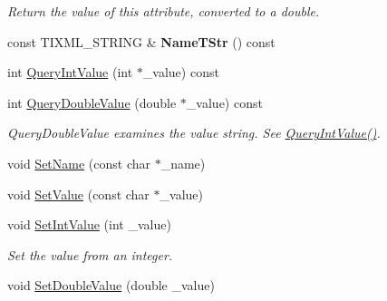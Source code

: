 \begin{DoxyCompactItemize}
\begin{DoxyCompactList}\small\item\em \-Return the value of this attribute, converted to a double. \end{DoxyCompactList}\item 
\hypertarget{class_ti_xml_attribute_a64cee17bceb8232eb0736d26dd082d79}{
const \-T\-I\-X\-M\-L\-\_\-\-S\-T\-R\-I\-N\-G \& {\bfseries \-Name\-T\-Str} () const }
\label{class_ti_xml_attribute_a64cee17bceb8232eb0736d26dd082d79}

\item 
int \hyperlink{class_ti_xml_attribute_ad6c93088ee21af41a107931223339344}{\-Query\-Int\-Value} (int $\ast$\-\_\-value) const 
\item 
\hypertarget{class_ti_xml_attribute_ac87b2a8489906a5d7aa2875f20be3513}{
int \hyperlink{class_ti_xml_attribute_ac87b2a8489906a5d7aa2875f20be3513}{\-Query\-Double\-Value} (double $\ast$\-\_\-value) const }
\label{class_ti_xml_attribute_ac87b2a8489906a5d7aa2875f20be3513}

\begin{DoxyCompactList}\small\item\em \-Query\-Double\-Value examines the value string. \-See \hyperlink{class_ti_xml_attribute_ad6c93088ee21af41a107931223339344}{\-Query\-Int\-Value()}. \end{DoxyCompactList}\item 
void \hyperlink{class_ti_xml_attribute_ab7fa3d21ff8d7c5764cf9af15b667a99}{\-Set\-Name} (const char $\ast$\-\_\-name)
\item 
void \hyperlink{class_ti_xml_attribute_a2dae44178f668b3cb48101be4f2236a0}{\-Set\-Value} (const char $\ast$\-\_\-value)
\item 
\hypertarget{class_ti_xml_attribute_a7e065df640116a62ea4f4b7da5449cc8}{
void \hyperlink{class_ti_xml_attribute_a7e065df640116a62ea4f4b7da5449cc8}{\-Set\-Int\-Value} (int \-\_\-value)}
\label{class_ti_xml_attribute_a7e065df640116a62ea4f4b7da5449cc8}

\begin{DoxyCompactList}\small\item\em \-Set the value from an integer. \end{DoxyCompactList}\item 
\hypertarget{class_ti_xml_attribute_a0316da31373496c4368ad549bf711394}{
void \hyperlink{class_ti_xml_attribute_a0316da31373496c4368ad549bf711394}{\-Set\-Double\-Value} (double \-\_\-value)}
\label{class_ti_xml_attribute_a0316da31373496c4368ad549bf711394}


\end{DoxyCompactItemize}
